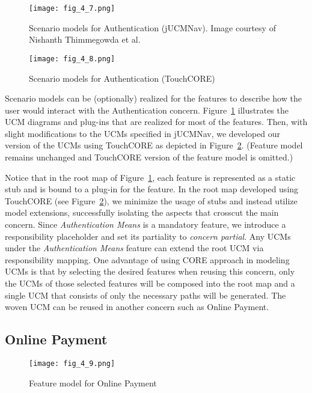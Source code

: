 \begin{figure}
	\centering
	\texttt{[image: fig\_4\_7.png]}
	\caption[Scenario models for Authentication (jUCMNav)]{Scenario models for Authentication (jUCMNav). Image courtesy of Nishanth Thimmegowda et al.~\cite{thimmegowda2014concern}}
	\label{fig:4.7}
\end{figure}

\begin{figure}
	\centering
	\texttt{[image: fig\_4\_8.png]}
	\caption{Scenario models for Authentication (TouchCORE)}
	\label{fig:4.8}
\end{figure}

Scenario models can be (optionally) realized for the features to describe how the user would interact with the Authentication concern. Figure~\ref{fig:4.7} illustrates the UCM diagrams and plug-ins that are realized for most of the features. Then, with slight modifications to the UCMs specified in jUCMNav, we developed our version of the UCMs using TouchCORE as depicted in Figure~\ref{fig:4.8}. (Feature model remains unchanged and TouchCORE version of the feature model is omitted.)

Notice that in the root map of Figure~\ref{fig:4.7}, each feature is represented as a static stub and is bound to a plug-in for the feature. In the root map developed using TouchCORE (see Figure~\ref{fig:4.8}), we minimize the usage of stubs and instead utilize model extensions, successfully isolating the aspects that crosscut the main concern. Since \emph{Authentication Means} is a mandatory feature, we introduce a responsibility placeholder and set its partiality to \emph{concern partial}. Any UCMs under the \emph{Authentication Means} feature can extend the root UCM via responsibility mapping. One advantage of using CORE approach in modeling UCMs is that by selecting the desired features when reusing this concern, only the UCMs of those selected features will be composed into the root map and a single UCM that consists of only the necessary paths will be generated. The woven UCM can be reused in another concern such as Online Payment.

\subsection{Online Payment}

\begin{figure}[h]
	\centering
	\texttt{[image: fig\_4\_9.png]}
	\caption{Feature model for Online Payment}
	\label{fig:4.9}
\end{figure}

